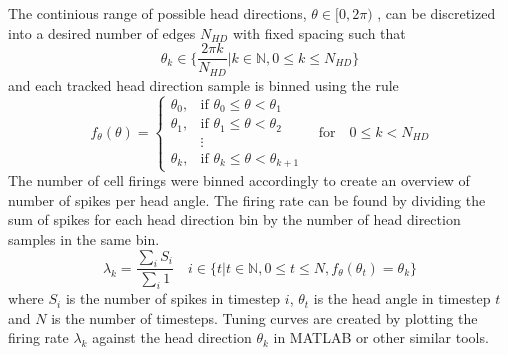 The continious range of possible head directions, 
$\theta \in [0, 2\pi)$
, can be discretized into a desired number of edges $N_{HD}$ with fixed spacing such that
\begin{equation}
\theta_k \in \{\frac{2 \pi k}{N_{HD}}| k \in \mathbb{N}, 0 \leq k \leq N_{HD} \}
\end{equation}
and each tracked head direction sample is binned using the rule
\begin{equation}
    f_{\theta}(\theta) =  \begin{cases}
        \theta_0, & \text{if } \theta_0 \leq \theta < \theta_{1} \\
        \theta_1, & \text{if } \theta_1 \leq \theta < \theta_{2} \\
         & \vdots \\
        \theta_k, & \text{if } \theta_k \leq \theta < \theta_{k+1}
    \end{cases} \quad \text{for} \quad 0 \leq k < N_{HD}
\end{equation}
The number of cell firings were binned accordingly to create an overview of number of spikes per head angle.
The firing rate can be found by dividing the sum of spikes for each head direction bin by the number of head direction samples in the same bin.
\begin{equation} \label{eq:firing_rate}
    \lambda_k = \frac{\sum_i S_i}{\sum_i 1} \quad i \in \{t | t \in \mathbb{N}, 0 \leq t \leq N, f_\theta(\theta_t) = \theta_k\}
\end{equation}
where $S_i$ is the number of spikes in timestep $i$, $\theta_t$ is the head angle in timestep $t$ and $N$ is the number of timesteps. Tuning curves are created by plotting the firing rate $\lambda_k$ against the head direction $\theta_k$ in MATLAB or other similar tools.

